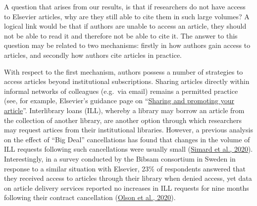 \documentclass[
]{article}
\begin{document}
A question that arises from our results, is that if researchers do not have access to Elsevier articles, why are they still able to cite them in such large volumes? A logical link would be that if authors are unable to access an article, they should not be able to read it and therefore not be able to cite it. The answer to this question may be related to two mechanisms: firstly in how authors gain access to articles, and secondly how authors cite articles in practice.

With respect to the first mechanism, authors possess a number of strategies to access articles beyond institutional subscriptions. Sharing articles directly within informal networks of colleagues (e.g.~via email) remains a permitted practice (see, for example, Elsevier's guidance page on ``\href{https://www.elsevier.com/authors/submit-your-paper/sharing-and-promoting-your-article}{Sharing and promoting your article}''. Interlibrary loans (ILL), whereby a library may borrow an article from the collection of another library, are another option through which researchers may request artices from their institutional libraries. However, a previous analysis on the effect of ``Big Deal'' cancellations has found that changes in the volume of ILL requests following such cancellations were usually small (\href{https://arxiv.org/abs/2009.04287}{Simard et al., 2020}). Interestingly, in a survey conducted by the Bibsam consortium in Sweden in response to a similar situation with Elsevier, 23\% of respondents answered that they received access to articles through their library when denied access, yet data on article delivery services reported no increases in ILL requests for nine months following their contract cancellation (\href{http://doi.org/10.1629/uksg.507}{Olson et al., 2020}).
\end{document}

